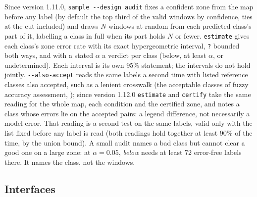 \documentclass[11pt,a4paper]{article}
\newcommand{\code}[1]{\texttt{#1}}
\begin{document}
Since version 1.11.0, \code{sample -{}-design audit} fixes a confident zone from the map before any label (by default the
top third of the valid windows by confidence, ties at the cut included) and draws $N$ windows at random from each
predicted class's part of it, labelling a class in full when its part holds $N$ or fewer. \code{estimate} gives each
class's zone error rate with its exact hypergeometric interval, \code{?} bounded both ways, and with a stated $\alpha$ a
verdict per class (below, at least $\alpha$, or undetermined). Each interval is its own 95\% statement; the intervals do
not hold jointly. \code{-{}-also-accept} reads the same labels a second time with listed reference classes also accepted,
such as a lenient crosswalk (the acceptable classes of fuzzy accuracy assessment, \citealp{gopal1994}); since version
1.12.0 \code{estimate} and \code{certify} take the same reading for the whole map, each condition and the certified zone, and notes a class whose errors lie on the accepted pairs: a legend difference, not
necessarily a model error. That reading is a second test on the same labels, valid only with the list fixed before any
label is read (both readings hold together at least 90\% of the time, by the union bound). A small audit names a bad
class but cannot clear a good one on a large zone: at $\alpha = 0.05$, \textit{below} needs at least 72 error-free labels
there. It names the class, not the windows.

\subsection{Interfaces}
\label{sec:interfaces}
\end{document}
